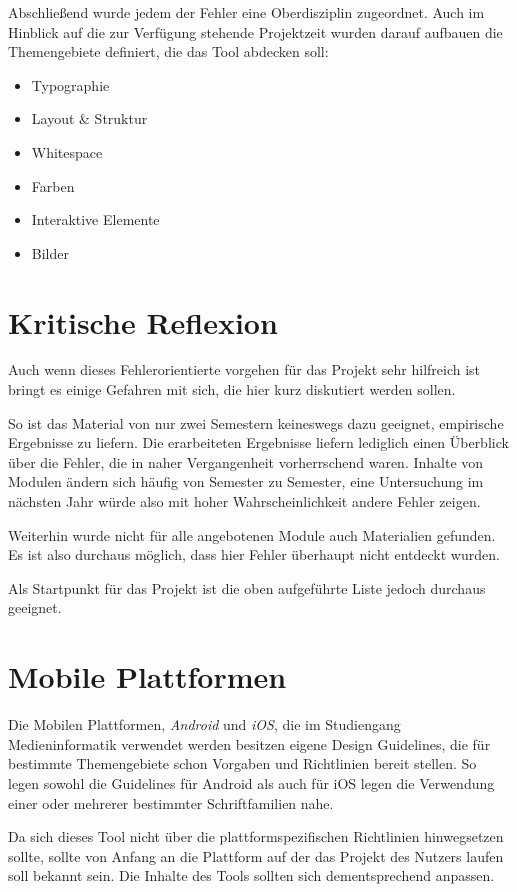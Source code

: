 Abschließend wurde jedem der Fehler eine Oberdisziplin zugeordnet. Auch im Hinblick auf die zur Verfügung stehende Projektzeit wurden darauf aufbauen die Themengebiete definiert, die das Tool abdecken soll:
\begin{itemize}
	\item Typographie
	\item Layout \& Struktur
	\item Whitespace
	\item Farben
	\item Interaktive Elemente
	\item Bilder
\end{itemize}



\section{Kritische Reflexion}
Auch wenn dieses Fehlerorientierte vorgehen für das Projekt sehr hilfreich ist bringt es einige Gefahren mit sich, die hier kurz diskutiert werden sollen.

So ist das Material von nur zwei Semestern keineswegs dazu geeignet, empirische Ergebnisse zu liefern. Die erarbeiteten Ergebnisse liefern lediglich einen Überblick über die Fehler, die in naher Vergangenheit vorherrschend waren. Inhalte von Modulen ändern sich häufig von Semester zu Semester, eine Untersuchung im nächsten Jahr würde also mit hoher Wahrscheinlichkeit andere Fehler zeigen.

Weiterhin wurde nicht für alle angebotenen Module auch Materialien gefunden. Es ist also durchaus möglich, dass hier Fehler überhaupt nicht entdeckt wurden.

Als Startpunkt für das Projekt ist die oben aufgeführte Liste jedoch durchaus geeignet.



\section{Mobile Plattformen} \label{Mobile Plattformen}
Die Mobilen Plattformen, \textit{Android} und \textit{iOS}, die im Studiengang Medieninformatik verwendet werden besitzen eigene Design Guidelines, die für bestimmte Themengebiete schon Vorgaben und Richtlinien bereit stellen. So legen sowohl die Guidelines für Android als auch für iOS legen die Verwendung einer oder mehrerer bestimmter Schriftfamilien nahe.

Da sich dieses Tool nicht über die plattformspezifischen Richtlinien hinwegsetzen sollte, sollte von Anfang an die Plattform  auf der das Projekt des Nutzers laufen soll bekannt sein. Die Inhalte des Tools sollten sich dementsprechend anpassen.


\clearpage
